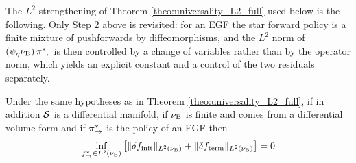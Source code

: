 The $L^2$ strengthening of Theorem \ref{theo:universality_L2_full} used below is the following. Only Step 2 above is revisited: for an EGF the star forward policy is a finite mixture of pushforwards by diffeomorphisms, and the $L^2$ norm of $\left(\psi_\eta\nu_{\mathrm{B}}\right)\pi_{\rightarrow}^*$ is then controlled by a change of variables rather than by the operator norm, which yields an explicit constant and a control of the two residuals separately.

\begin{theorem}\label{theo:universality_L2_body}
    Under the same hypotheses as in Theorem \ref{theo:universality_L2_full}, if in addition $\mathcal S$ is a differential manifold, if $\nu_{\mathrm{B}}$ is finite and comes from a differential volume form and if $\pi_{\rightarrow}^*$ is the policy of an EGF then
    \begin{equation}
        \inf_{f^*_{\rightarrow}\in L^2(\nu_{\mathrm{B}})} \left[\|\delta f_{\mathrm{init}}\|_{L^2(\nu_{\mathrm{B}})} + \|\delta f_{\mathrm{term}}\|_{L^2(\nu_{\mathrm{B}})}\right]= 0
    \end{equation}
\end{theorem}

